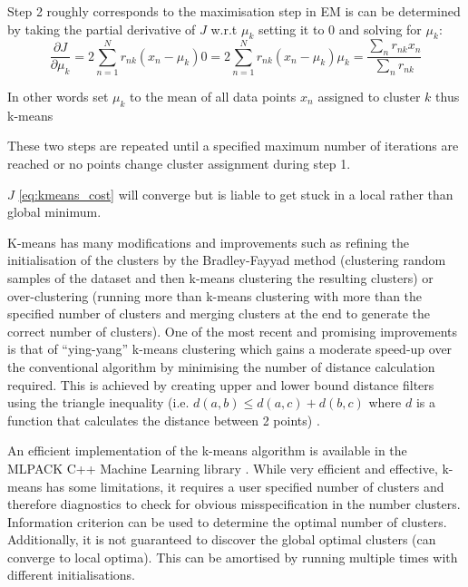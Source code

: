 Step 2 roughly corresponds to the maximisation step in EM is can be determined by taking the partial derivative of \(J\) w.r.t 
\(\mu_{k}\) setting it to 0 and solving for \(\mu_{k}\):
\[
    \frac{\partial J}{\partial \mu_{k}} = 2 \sum_{n=1}^{N} r_{nk} (x_{n} - \mu_{k})
    0 = 2 \sum_{n=1}^{N} r_{nk} (x_{n} - \mu_{k})
    \mu_{k} = \frac{\sum_{n} r_{nk}x_{n}}{\sum_{n} r_{nk}}
\]

In other words set \(\mu_{k}\) to the mean of all data points \(x_{n}\) assigned to cluster \(k\) thus k-means \citep{Bishop2006}

These two steps are repeated until a specified maximum number of iterations are reached or no points change cluster assignment during
step 1.

\(J\) \ref{eq:kmeans_cost} will converge but is liable to get stuck in a local rather than global minimum.

K-means has many modifications and improvements such as refining the initialisation of the clusters by 
the Bradley-Fayyad method (clustering random samples of the dataset and then k-means clustering the resulting clusters) \citep{Bradley1998} 
or over-clustering (running more than k-means clustering with more than the specified number of clusters and merging clusters at the end
to generate the correct number of clusters). One of the most recent and promising improvements is that of ``ying-yang'' k-means
clustering which gains a moderate speed-up over the conventional algorithm by minimising the number of distance calculation required.
This is achieved by creating upper and lower bound distance filters using the triangle inequality (i.e. \(d(a,b) \leq d(a,c) + d(b,c)\) where 
\(d\) is a function that calculates the distance between 2 points) \citep{Ding2015}.



An efficient implementation of the k-means algorithm is available in the MLPACK C++ Machine Learning library \citep{mlpack2013}.
While very efficient and effective, k-means has some limitations, it requires a user specified number of clusters
and therefore diagnostics to check for obvious misspecification in the number clusters.  Information criterion
can be used to determine the optimal number of clusters.
Additionally, it is not guaranteed
to discover the global optimal clusters (can converge to local optima).  This can be amortised by running multiple times 
with different initialisations.



